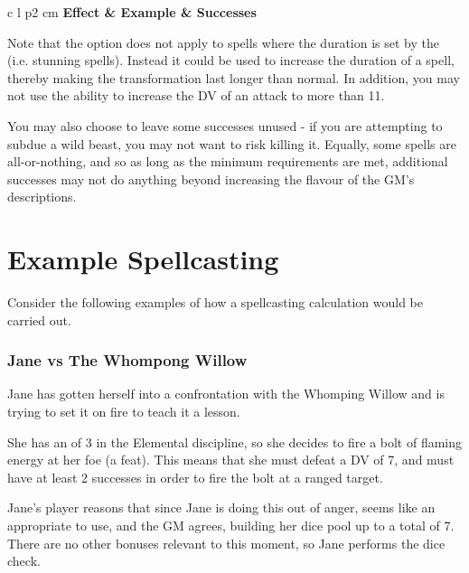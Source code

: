 \begin{center}
	\begin{rndtable}{c l p{2 cm}}
	\bf Effect	&	\bf Example	&	\bf Successes
	\\
	\end{rndtable}
\end{center}

Note that the  option does not apply to spells where the duration is set by the  (i.e. stunning spells). Instead it could be used to increase the duration of a  spell, thereby making the transformation last longer than normal. In addition, you may not use the  ability to increase the DV of an attack to more than 11. 

You may also choose to leave some successes unused - if you are attempting to subdue a wild beast, you may not want to risk killing it. Equally, some spells are all-or-nothing, and so as long as the minimum requirements are met, additional successes may not do anything beyond increasing the flavour of the GM's descriptions. 

\section{Example Spellcasting}\label{S:ExampleSpells}

Consider the following examples of how a spellcasting calculation would be carried out.

\subsubsection{Jane vs The Whompong Willow}

Jane has gotten herself into a confrontation with the Whomping Willow and is trying to set it on fire to teach it a lesson. 

She has an  of 3 in the Elemental discipline, so she decides to fire a bolt of flaming energy at her foe (a \levelTwo{} feat). This means that she must defeat a DV of 7, and must have at least 2 successes in order to fire the bolt at a ranged target.

Jane's player reasons that since Jane is doing this out of anger,  seems like an appropriate  to use, and the GM agrees, building her dice pool up to a total of 7. There are no other bonuses relevant to this moment, so Jane performs the dice check. 

